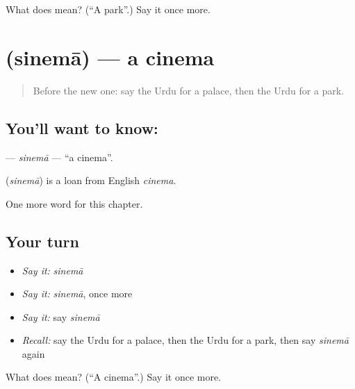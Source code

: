 \begin{tcolorbox}[breakable,colback=teal!4,colframe=teal!35!black,title={Before you move on}]
What does  mean? (\textquotedblleft{}A park\textquotedblright{}.) Say it once more.
\end{tcolorbox}
\section[\texorpdfstring{\ur{سینما} (sinemā)}{سینما (sinemā)}]{ (sinemā) — a cinema}

\label{lesson:UR-C101-sinema}



\begin{quote}
Before the new one: say the Urdu for a palace, then the Urdu for a park.
\end{quote}

\subsection*{You'll want to know: }
\textbf{} — \emph{sinemā} — \textquotedblleft{}a cinema\textquotedblright{}.

\begin{cousinweb}
\textbf{} (\emph{sinemā}) is a loan from English \emph{cinema}.
\end{cousinweb}

\begin{grammarlens}[title={What you've built}]
One more word for this chapter.
\end{grammarlens}

\subsection*{Your turn}
\begin{itemize}
\raggedright
  \item \emph{Say it:} \emph{sinemā}
  \item \emph{Say it:} \emph{sinemā}, once more
  \item \emph{Say it:} say \emph{sinemā}
  \item \emph{Recall:} say the Urdu for a palace, then the Urdu for a park, then say \emph{sinemā} again
\end{itemize}

\begin{tcolorbox}[breakable,colback=teal!4,colframe=teal!35!black,title={Before you move on}]
What does  mean? (\textquotedblleft{}A cinema\textquotedblright{}.) Say it once more.
\end{tcolorbox}
